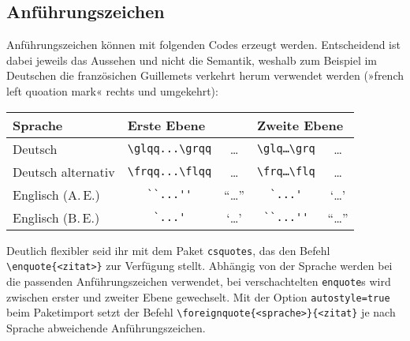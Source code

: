 \subsection{Anführungszeichen}
Anführungszeichen können mit folgenden Codes erzeugt werden.
Entscheidend ist dabei jeweils das Aussehen und nicht die Semantik, weshalb zum Beispiel im Deutschen die französichen Guillemets verkehrt herum verwendet werden (»french left quoation mark« rechts und umgekehrt):
\begin{center}
	\begin{longtable}{lcccc}
		\toprule
		Sprache & \multicolumn{2}{l}{Erste Ebene} & \multicolumn{2}{l}{Zweite Ebene} \\
		\midrule
		Deutsch & \verb|\glqq...\grqq| & \glqq…\grqq & \verb|\glq…\grq| & \glq…\grq \\
		Deutsch alternativ & \verb|\frqq...\flqq| & \frqq…\flqq & \verb|\frq…\flq| & \frq…\flq \\
		Englisch (A.\,E.) & \verb|``...''| & ``…'' & \verb|`...'| & `…' \\
		Englisch (B.\,E.) & \verb|`...'| & `…' & \verb|``...''| & ``…'' \\
		\bottomrule
	\end{longtable}
\end{center}
Deutlich flexibler seid ihr mit dem Paket \texttt{csquotes}, das den Befehl \texttt{\textbackslash{}enquote\{<zitat>\}} zur Verfügung stellt.
Abhängig von der Sprache werden bei die passenden Anführungszeichen verwendet, bei verschachtelten \texttt{enquote}s wird zwischen erster und zweiter Ebene gewechselt.
Mit der Option \texttt{autostyle=true} beim Paketimport setzt der Befehl \texttt{\textbackslash{}foreignquote\{<sprache>\}\{<zitat\}} je nach Sprache abweichende Anführungszeichen.

